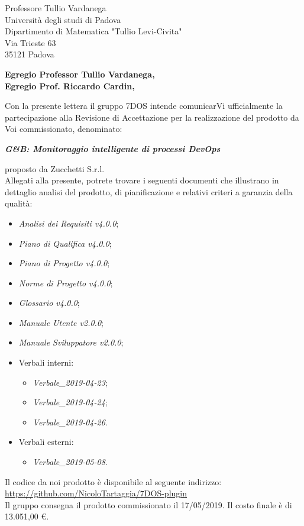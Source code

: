 \begin{letter}{Professore Tullio Vardanega \\ Università degli studi di Padova \\ Dipartimento di Matematica "Tullio Levi-Civita" \\ Via Trieste 63 \\ 35121 Padova}
\opening{\textbf{Egregio Professor Tullio Vardanega,\\Egregio Prof. Riccardo Cardin,}}
\begin{addmargin}[2em]{2em}
  Con la presente lettera il gruppo 7DOS intende comunicarVi ufficialmente la partecipazione alla Revisione di Accettazione per la realizzazione del prodotto da Voi commissionato, denominato:
   \singlespacing 
   \centerline{\textbf{\emph{G\&B: Monitoraggio intelligente di processi DevOps}}}
  \singlespacing
  proposto da Zucchetti S.r.l. \\
  Allegati alla presente, potrete trovare i seguenti documenti che illustrano in dettaglio analisi del prodotto, di pianificazione e relativi criteri a garanzia della qualità:
      \begin{itemize}
	      \item \emph{Analisi dei Requisiti v4.0.0};
	      \item \emph{Piano di Qualifica v4.0.0};
	      \item \emph{Piano di Progetto v4.0.0};
	      \item \emph{Norme di Progetto v4.0.0};
	      \item \emph{Glossario v4.0.0};
	      \item \emph{Manuale Utente v2.0.0};
   	      \item \emph{Manuale Sviluppatore v2.0.0};
	      \item Verbali interni:
	            \begin{itemize}
		           	\item \emph{Verbale\_2019-04-23};
		           	\item \emph{Verbale\_2019-04-24};
		           	\item \emph{Verbale\_2019-04-26}.
	           	\end{itemize}
          \item Verbali esterni:
          \begin{itemize}
          	\item \emph{Verbale\_2019-05-08}.
          \end{itemize}
	\end{itemize}

	Il codice da noi prodotto è disponibile al seguente indirizzo:\\[0.2cm]
	\hspace*{10mm}\url{https://github.com/NicoloTartaggia/7DOS-plugin}\\[0.2cm]
  Il gruppo consegna il prodotto commissionato il 17/05/2019. Il costo finale è di 13.051,00 \euro.\\
  

\end{addmargin}
\end{letter}
